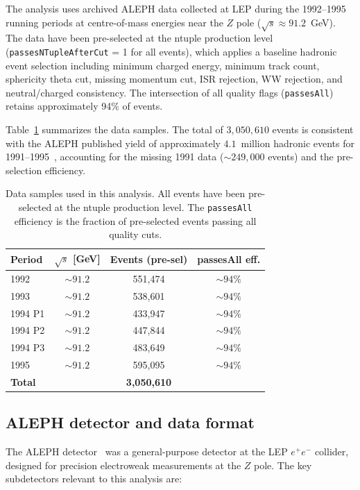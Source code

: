 \documentclass[11pt,a4paper]{article}
\begin{document}
The analysis uses archived ALEPH data collected at LEP during the 1992--1995 running
periods at centre-of-mass energies near the $Z$ pole ($\sqrt{s} \approx 91.2$~GeV).
The data have been pre-selected at the ntuple production level
(\texttt{passesNTupleAfterCut} = 1 for all events), which applies a baseline hadronic
event selection including minimum charged energy, minimum track count, sphericity theta
cut, missing momentum cut, ISR rejection, WW rejection, and neutral/charged consistency.
The intersection of all quality flags (\texttt{passesAll}) retains approximately 94\%
of events.

Table~\ref{tab:data_samples} summarizes the data samples.  The total of
$3{,}050{,}610$ events is consistent with the ALEPH published yield of approximately
$4.1$~million hadronic events for 1991--1995~\cite{ALEPH:AFBb}, accounting for the
missing 1991 data ($\sim 249{,}000$ events) and the pre-selection efficiency.

\begin{table}[htbp]
\centering
\caption{Data samples used in this analysis. All events have been pre-selected at
the ntuple production level. The \texttt{passesAll} efficiency is the fraction of
pre-selected events passing all quality cuts.}
\label{tab:data_samples}
\begin{tabular}{lccc}
\toprule
Period & $\sqrt{s}$ [GeV] & Events (pre-sel) & passesAll eff. \\
\midrule
1992 & $\sim 91.2$ & 551,474 & $\sim 94\%$ \\
1993 & $\sim 91.2$ & 538,601 & $\sim 94\%$ \\
1994 P1 & $\sim 91.2$ & 433,947 & $\sim 94\%$ \\
1994 P2 & $\sim 91.2$ & 447,844 & $\sim 94\%$ \\
1994 P3 & $\sim 91.2$ & 483,649 & $\sim 94\%$ \\
1995 & $\sim 91.2$ & 595,095 & $\sim 94\%$ \\
\midrule
\textbf{Total} & & \textbf{3,050,610} & \\
\bottomrule
\end{tabular}
\end{table}

\subsection{ALEPH detector and data format}
\label{sec:aleph_detector}

The ALEPH detector~\cite{ALEPH:VDET} was a general-purpose detector at the LEP
$e^+e^-$ collider, designed for precision electroweak measurements at the $Z$ pole.
The key subdetectors relevant to this analysis are:
\end{document}
